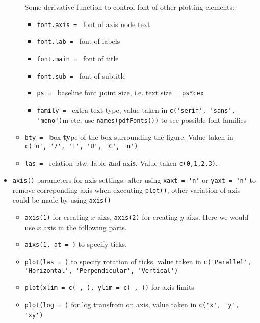 \begin{itemize}[topsep=2pt,itemsep=0pt]
\begin{itemize}[topsep=2pt,itemsep=0pt]
        Some derivative function to control font of other plotting elements:
        \begin{itemize}[topsep=2pt,itemsep=0pt]
            \item \lstinline|font.axis = | font of axis node text
            \item \lstinline|font.lab = | font of labels
            \item \lstinline|font.main = | font of title 
            \item \lstinline|font.sub = | font of subtitle 
            \item \lstinline|ps = | baseline font \textbf{p}oint \textbf{s}ize, i.e. text size = \lstinline|ps*cex|
            \item \lstinline|family = | extra text type, value taken in \lstinline|c('serif', 'sans', 'mono')|m etc. use \lstinline|names(pdfFonts())| to see possible font families
        \end{itemize}
        \item \lstinline|bty = | \textbf{b}ox \textbf{ty}pe of the box surrounding the figure. Value taken in \lstinline|c('o', '7', 'L', 'U', 'C', 'n')| 
        \item \lstinline|las = | relation btw. \textbf{l}able \textbf{a}nd axi\textbf{s}. Value taken \lstinline|c(0,1,2,3)|.
    \end{itemize}
    \item \lstinline|axis()| parameters for axis settings: after using \lstinline|xaxt = 'n'| or \lstinline|yaxt = 'n'| to remove correponding axis when executing \lstinline|plot()|, other variation of axis could be made by using \lstinline|axis()|
    \begin{itemize}[topsep=2pt,itemsep=0pt]
        \item \lstinline|axis(1)| for creating $ x $ aixs, \lstinline|axis(2)| for creating $ y $ aixs. Here we would use $ x $ axis in the following parts.
        \item \lstinline|aixs(1, at = )| to specify ticks.
        \item \lstinline|plot(las = )| to specify rotation of ticks, value taken in \lstinline|c('Parallel', 'Horizontal', 'Perpendicular', 'Vertical')|
        \item \lstinline|plot(xlim = c( , ), ylim = c( , ))| for axis limits
        \item \lstinline|plot(log = )| for log transfrom on axis, value taken in \lstinline|c('x', 'y', 'xy')|. 
    \end{itemize}
    

\end{itemize}
